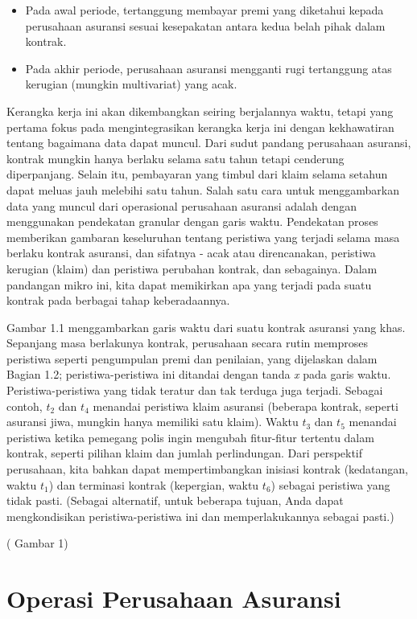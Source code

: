 \documentclass[
]{book}
\providecommand{\tightlist}{%
  \setlength{\itemsep}{0pt}\setlength{\parskip}{0pt}}
\begin{document}
\begin{itemize}
\tightlist
\item
  Pada awal periode, tertanggung membayar premi yang diketahui kepada perusahaan asuransi sesuai kesepakatan antara kedua belah pihak dalam kontrak.
\item
  Pada akhir periode, perusahaan asuransi mengganti rugi tertanggung atas kerugian (mungkin multivariat) yang acak.
\end{itemize}

Kerangka kerja ini akan dikembangkan seiring berjalannya waktu, tetapi yang pertama fokus pada mengintegrasikan kerangka kerja ini dengan kekhawatiran tentang bagaimana data dapat muncul. Dari sudut pandang perusahaan asuransi, kontrak mungkin hanya berlaku selama satu tahun tetapi cenderung diperpanjang. Selain itu, pembayaran yang timbul dari klaim selama setahun dapat meluas jauh melebihi satu tahun. Salah satu cara untuk menggambarkan data yang muncul dari operasional perusahaan asuransi adalah dengan menggunakan pendekatan granular dengan garis waktu. Pendekatan proses memberikan gambaran keseluruhan tentang peristiwa yang terjadi selama masa berlaku kontrak asuransi, dan sifatnya - acak atau direncanakan, peristiwa kerugian (klaim) dan peristiwa perubahan kontrak, dan sebagainya. Dalam pandangan mikro ini, kita dapat memikirkan apa yang terjadi pada suatu kontrak pada berbagai tahap keberadaannya.

Gambar 1.1 menggambarkan garis waktu dari suatu kontrak asuransi yang khas. Sepanjang masa berlakunya kontrak, perusahaan secara rutin memproses peristiwa seperti pengumpulan premi dan penilaian, yang dijelaskan dalam Bagian 1.2; peristiwa-peristiwa ini ditandai dengan tanda \emph{x} pada garis waktu. Peristiwa-peristiwa yang tidak teratur dan tak terduga juga terjadi. Sebagai contoh, \(t_2\) dan \(t_4\) menandai peristiwa klaim asuransi (beberapa kontrak, seperti asuransi jiwa, mungkin hanya memiliki satu klaim). Waktu \(t_3\) dan \(t_5\) menandai peristiwa ketika pemegang polis ingin mengubah fitur-fitur tertentu dalam kontrak, seperti pilihan klaim dan jumlah perlindungan. Dari perspektif perusahaan, kita bahkan dapat mempertimbangkan inisiasi kontrak (kedatangan, waktu \(t_1\)) dan terminasi kontrak (kepergian, waktu \(t_6\)) sebagai peristiwa yang tidak pasti. (Sebagai alternatif, untuk beberapa tujuan, Anda dapat mengkondisikan peristiwa-peristiwa ini dan memperlakukannya sebagai pasti.)

( Gambar 1)

\hypertarget{operasi-perusahaan-asuransi}{%
\section{Operasi Perusahaan Asuransi}\label{operasi-perusahaan-asuransi}}
\end{document}
